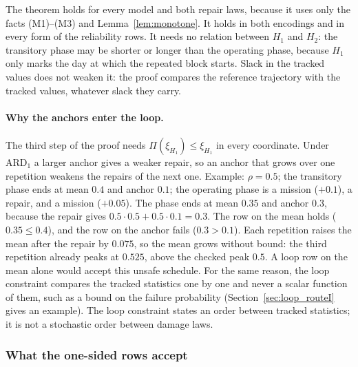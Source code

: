 \documentclass[11pt,a4paper]{article}
\theoremstyle{plain}
\theoremstyle{definition}
\theoremstyle{remark}
\begin{document}
The theorem holds for every model and both repair laws, because it uses only the facts (M1)--(M3) and Lemma~\ref{lem:monotone}.
It holds in both encodings and in every form of the reliability rows.
It needs no relation between $H_1$ and $H_2$: the transitory phase may be shorter or longer than the operating phase, because $H_1$ only marks the day at which the repeated block starts.
Slack in the tracked values does not weaken it: the proof compares the reference trajectory with the tracked values, whatever slack they carry.

\paragraph{Why the anchors enter the loop.}
The third step of the proof needs $\Pi(\xi_{H_1}) \le \xi_{H_1}$ in every coordinate.
Under $\text{ARD}_1$ a larger anchor gives a weaker repair, so an anchor that grows over one repetition weakens the repairs of the next one.
Example: $\rho = 0.5$; the transitory phase ends at mean $0.4$ and anchor $0.1$; the operating phase is a mission ($+0.1$), a repair, and a mission ($+0.05$).
The phase ends at mean $0.35$ and anchor $0.3$, because the repair gives $0.5 \cdot 0.5 + 0.5 \cdot 0.1 = 0.3$.
The row on the mean holds ($0.35 \le 0.4$), and the row on the anchor fails ($0.3 > 0.1$).
Each repetition raises the mean after the repair by $0.075$, so the mean grows without bound: the third repetition already peaks at $0.525$, above the checked peak $0.5$.
A loop row on the mean alone would accept this unsafe schedule.
For the same reason, the loop constraint compares the tracked statistics one by one and never a scalar function of them, such as a bound on the failure probability (Section~\ref{sec:loop_routeI} gives an example).
The loop constraint states an order between tracked statistics; it is not a stochastic order between damage laws.

\subsubsection{What the one-sided rows accept}
\label{sec:acceptance}
\end{document}
